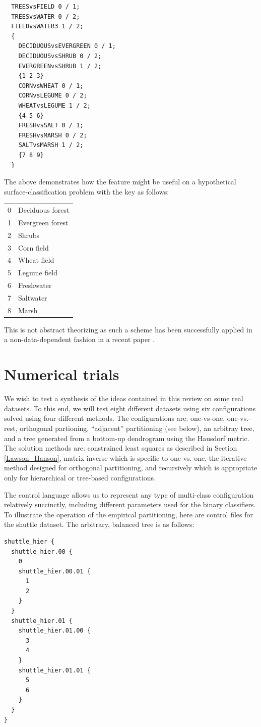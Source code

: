 \begin{verbatim}
  TREESvsFIELD 0 / 1;
  TREESvsWATER 0 / 2;
  FIELDvsWATER3 1 / 2;
  {
    DECIDUOUSvsEVERGREEN 0 / 1;
    DECIDUOUSvsSHRUB 0 / 2;
    EVERGREENvsSHRUB 1 / 2;
    {1 2 3}
    CORNvsWHEAT 0 / 1;
    CORNvsLEGUME 0 / 2;
    WHEATvsLEGUME 1 / 2;
    {4 5 6}
    FRESHvsSALT 0 / 1;
    FRESHvsMARSH 0 / 2;
    SALTvsMARSH 1 / 2;
    {7 8 9}
  }
\end{verbatim}

The above demonstrates how the feature might be useful
on a hypothetical surface-classification problem with the key as follows:

\begin{tabular}{ll}
	0 & Deciduous forest \\
	1 & Evergreen forest \\
	2 & Shrubs \\
	3 & Corn field \\
	4 & Wheat field \\
	5 & Legume field \\
	6 & Freshwater \\
	7 & Saltwater \\
	8 & Marsh
\end{tabular}

This is not abstract theorizing as
such a scheme has been successfully applied in a non-data-dependent fashion
in a recent paper \citep{Zhou_etal2019}.

\section{Numerical trials}

We wish to test a synthesis of the ideas contained in this review on some real
datasets.
To this end, we will test eight different datasets using six configurations 
solved using four different methods.
The configurations are: one-vs-one, one-vs.-rest, orthogonal partioning,
``adjacent'' partitioning (see below), an arbitray tree, and a tree generated
from a bottom-up dendrogram using the Hausdorf metric.
The solution methods are: constrained least squares as described
in Section \ref{Lawson_Hanson}, matrix inverse which is specific to one-vs.-one,
the iterative method designed for orthogonal partitioning,
and recursively which is appropriate
only for hierarchical or tree-based configurations.

The control language allows us to represent any type of multi-class 
configuration relatively succinctly, including different parameters
used for the binary classifiers.
To illustrate the operation of the empirical partitioning, here are
control files for the shuttle dataset.
The arbitrary, balanced tree is as follows:
\begin{verbatim}
shuttle_hier {
  shuttle_hier.00 {
    0
    shuttle_hier.00.01 {
      1
      2
    }
  }
  shuttle_hier.01 {
    shuttle_hier.01.00 {
      3
      4
    }
    shuttle_hier.01.01 {
      5
      6
    }
  }
}

\end{verbatim}

